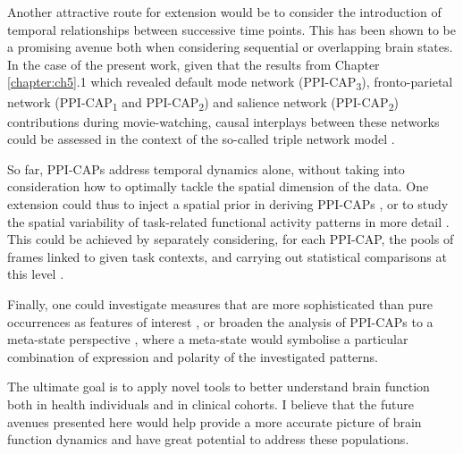 Another attractive route for extension would be to consider the introduction of temporal relationships between successive time points. This has been shown to be a promising avenue both when considering sequential \citep{Eavani2013,Chen2016, Vidaurre2017} or overlapping \citep{Sourty2016, Bolton2018a} brain states. In the case of the present work, given that the results from Chapter \ref{chapter:ch5}.1 which revealed default mode network (PPI-CAP\textsubscript{3}), fronto-parietal network (PPI-CAP\textsubscript{1} and PPI-CAP\textsubscript{2}) and salience network (PPI-CAP\textsubscript{2}) contributions during movie-watching, causal interplays between these networks could be assessed in the context of the so-called triple network model \citep{Menon2011}. 

So far, PPI-CAPs address temporal dynamics alone, without taking into consideration how to optimally tackle the spatial dimension of the data. One extension could thus to inject a spatial prior in deriving PPI-CAPs \citep{Zhuang2018}, or to study the spatial variability of task-related functional activity patterns in more detail \citep{Kiviniemi2011}. This could be achieved by separately considering, for each PPI-CAP, the pools of frames linked to given task contexts, and carrying out statistical comparisons at this level \citep{Amico2014}. 


Finally, one could investigate measures that are more sophisticated than pure occurrences as features of interest \citep{Chen2015, Bolton2020}, or broaden the analysis of PPI-CAPs to a meta-state perspective \citep{Miller2016,Vidaurre2017}, where a meta-state would symbolise a particular combination of expression and polarity of the investigated patterns.

The ultimate goal is to apply novel tools to better understand brain function both in health individuals and in clinical cohorts. I believe that the future avenues presented here would help provide a more accurate picture of brain function dynamics and have great potential to address these populations.


